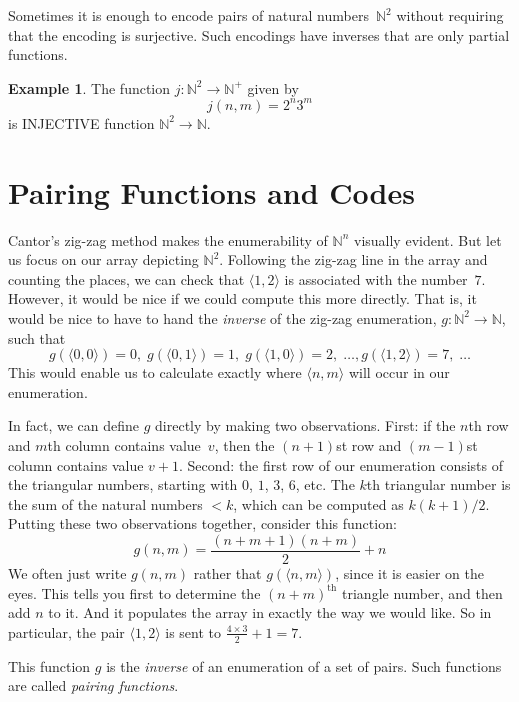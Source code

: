 \documentclass[10pt,a4paper]{article}
\newcommand*{\olup}[1]{\MakeUppercase{#1}}
\theoremstyle{plain}
\theoremstyle{definition}
\newtheorem{ex}[thm]{Example}
\theoremstyle{remark}
\newenvironment{explain}{}{}
\newcommand*{\olfileid}[3]{}
\newcommand*{\olsection}[1]{\section*{#1}}
\providecommand{\tuple}[1]{\langle #1 \rangle}
\providecommand{\Nat}{\ensuremath{\mathbb{N}}}
\begin{document}
Sometimes it is enough to encode pairs of natural numbers~$\Nat^2$
without requiring that the encoding is surjective. Such encodings have
inverses that are only partial functions. 

\begin{ex}
The function $j\colon \Nat^2 \to \Nat^+$ given by
\[
j(n,m) = 2^n3^m
\]
is \olup{injective} function $\Nat^2 \to \Nat$.
\end{ex}




\olfileid{sfr}{siz}{pai}
\olsection{Pairing Functions and Codes}

\begin{explain}
Cantor's zig-zag method makes the enumerability of $\Nat^n$ visually
evident. But let us focus on our array depicting $\Nat^2$. Following
the zig-zag line in the array and counting the places, we can check
that $\tuple{1,2}$ is associated with the number~$7$. However, it would
be nice if we could compute this more directly. That is, it would be
nice to have to hand the \emph{inverse} of the zig-zag enumeration,
$g\colon \Nat^2 \to \Nat$, such that
\[
g(\tuple{0,0}) = 0, \;
g(\tuple{0,1}) = 1, \;
g(\tuple{1,0}) = 2, \; \dots,  
g(\tuple{1,2}) = 7, \; \dots
\]
This would enable us to calculate exactly where $\tuple{n, m}$ will occur
in our enumeration. 

In fact, we can define $g$ directly by making two observations. First:
if the $n$th row and $m$th column contains value~$v$, then the
$(n+1)$st row and $(m-1)$st column contains value $v + 1$. Second: the
first row of our enumeration consists of the triangular numbers,
starting with $0$, $1$, $3$, $6$, etc. The $k$th triangular number is
the sum of the natural numbers $< k$, which can be computed as
$k(k+1)/2$. Putting these two observations together, consider this
function:
\[
  g(n,m) = \frac{(n+m+1)(n+m)}{2} + n
\]
We often just write $g(n, m)$ rather that $g(\tuple{n, m})$, since it
is easier on the eyes. This tells you first to determine the
$(n+m)^\text{th}$ triangle number, and then add $n$ to it. And
it populates the array in exactly the way we would like. So in
particular, the pair $\tuple{1, 2}$ is sent to $\frac{4 \times 3}{2} +
1 = 7$. 

This function $g$ is the \emph{inverse} of an enumeration of a set of
pairs. Such functions are called \emph{pairing functions}.
\end{explain}
\end{document}
